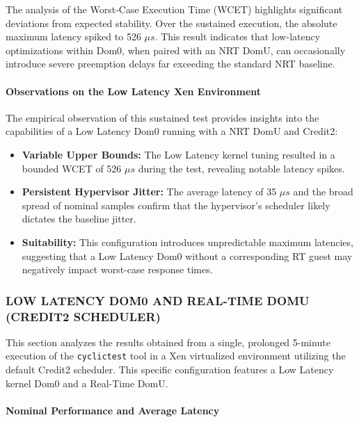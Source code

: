 The analysis of the Worst-Case Execution Time (WCET) highlights
significant deviations from expected stability. Over the sustained
execution, the absolute maximum latency spiked to 526 $\mu s$. This result
indicates that low-latency optimizations within Dom0, when paired with
an NRT DomU, can occasionally introduce severe preemption delays far
exceeding the standard NRT baseline.

\paragraph{Observations on the Low Latency Xen
Environment}\label{observations-on-the-low-latency-xen-environment-1}

The empirical observation of this sustained test provides insights into
the capabilities of a Low Latency Dom0 running with a NRT DomU and
Credit2:

\begin{itemize}
\item
  \textbf{Variable Upper Bounds:} The Low Latency kernel tuning resulted
  in a bounded WCET of 526 $\mu s$ during the test, revealing notable latency
  spikes.
\item
  \textbf{Persistent Hypervisor Jitter:} The average latency of 35 $\mu s$
  and the broad spread of nominal samples confirm that the hypervisor's
  scheduler likely dictates the baseline jitter.
\item
  \textbf{Suitability:} This configuration introduces unpredictable
  maximum latencies, suggesting that a Low Latency Dom0 without a
  corresponding RT guest may negatively impact worst-case response
  times.
\end{itemize}

\subsubsection{LOW LATENCY DOM0 AND REAL-TIME DOMU (CREDIT2
SCHEDULER)}\label{low-latency-dom0-and-real-time-domu-credit2-scheduler-1}

This section analyzes the results obtained from a single, prolonged
5-minute execution of the \texttt{cyclictest} tool in a Xen virtualized
environment utilizing the default Credit2 scheduler. This specific
configuration features a Low Latency kernel Dom0 and a Real-Time DomU.

\paragraph{Nominal Performance and Average
Latency}\label{nominal-performance-and-average-latency-14}

